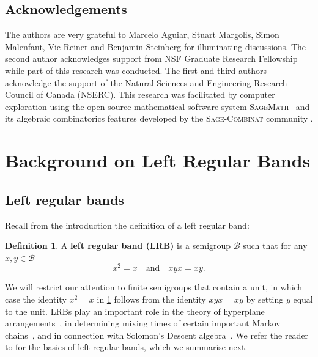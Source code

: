 \documentclass[11pt, oneside, reqno]{amsart}
\theoremstyle{definition}
\newtheorem{definition}[theorem]{Definition}
\numberwithin{equation}{section}
\newcommand{\defn}[1]{{\color{RoyalBlue}\bf#1}}
\def \BB{{\mathcal{B}}}
\begin{document}
\subsection*{Acknowledgements}
The authors are very grateful to Marcelo Aguiar, Stuart Margolis, Simon Malenfant, Vic Reiner and Benjamin Steinberg for illuminating discussions. The second author acknowledges support from NSF Graduate Research Fellowship while part of this research was conducted.
The first and third authors acknowledge the support of the Natural Sciences and Engineering Research Council of Canada (NSERC).
This research was facilitated by computer exploration using the open-source
mathematical software system \textsc{SageMath}~\cite{SageMath} and its algebraic
combinatorics features developed by the \textsc{Sage-Combinat} community
\cite{sage-combinat}.

\section{Background on Left Regular Bands}\label{sec:backgroundLRB}

\subsection{Left regular bands}
Recall from the introduction the definition of a left regular band:
\begin{definition}\label{def:lrb}
    A \defn{left regular band (LRB)} is a semigroup $\BB$ such that for any $x,y \in \BB$
    \begin{equation*}
        x^2 = x
        \quad\text{and}\quad
        xyx = xy.
    \end{equation*}
\end{definition}
We will restrict our attention to finite semigroups that contain a unit, in which case
the identity $x^2 = x$ in \cref{def:lrb} follows from the identity $xyx = xy$ by setting $y$ equal to the unit.
LRBs play an important role in the theory of hyperplane arrangements~\cite{am17}, in determining mixing times of certain important Markov chains~\cite{BHR}, and in connection with Solomon's Descent algebra~\cite{bidigare}.
We refer the reader to \citep[Appendix B]{BrownOnLRBs} for the basics of left regular bands, which we summarise next.
\end{document}
